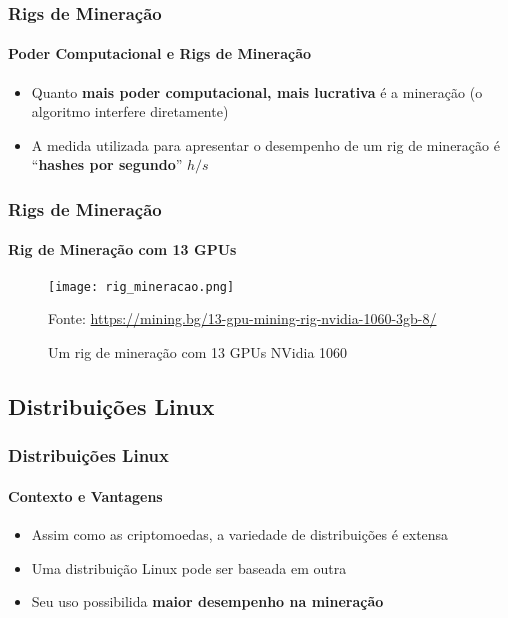 \documentclass[aspectratio=43]{beamer}
\begin{document}
\begin{frame}
    \frametitle{Rigs de Mineração}
    \framesubtitle{Poder Computacional e Rigs de Mineração}

    \begin{itemize}
        \item Quanto \textbf{mais poder computacional, mais lucrativa} é a
            mineração (o algoritmo interfere diretamente)

        \item A medida utilizada para apresentar o desempenho de um
            rig de mineração é ``\textbf{hashes por segundo}'' $h/s$

    \end{itemize}
\end{frame}

\begin{frame}
    \frametitle{Rigs de Mineração}
    \framesubtitle{Rig de Mineração com 13 GPUs}

    \begin{figure}[H]
        \caption{\label{fig:rig_mineracao}Um rig de mineração com 13 GPUs
        NVidia 1060}
        \begin{center}
            \texttt{[image: rig\_mineracao.png]}
        \end{center}
        Fonte: \url{https://mining.bg/13-gpu-mining-rig-nvidia-1060-3gb-8/}
    \end{figure}
\end{frame}

\subsection{Distribuições Linux}
\begin{frame}
    \frametitle{Distribuições Linux}
    \framesubtitle{Contexto e Vantagens}

    \begin{itemize}
        \item Assim como as criptomoedas, a variedade de distribuições
            é extensa

        \item Uma distribuição Linux pode ser baseada em outra

        \item Seu uso possibilida \textbf{maior desempenho na
            mineração}
    
    \end{itemize}
\end{frame}
\end{document}
